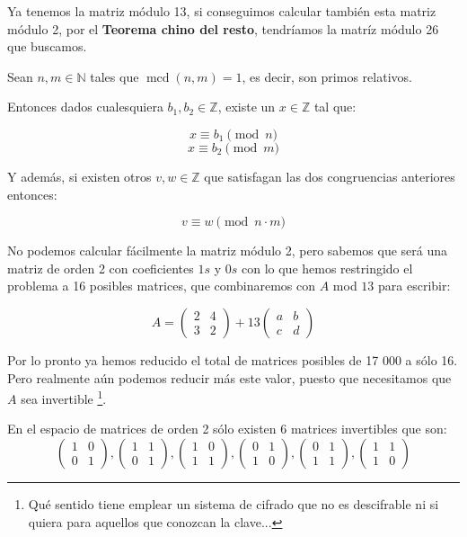 \begin{example}
Ya tenemos la matriz módulo 13, si conseguimos calcular también esta matriz módulo 2, por el \textbf{Teorema chino del resto}, tendríamos la matríz módulo 26 que buscamos.

\begin{theorem}
Sean $n,m \in \mathbb{N}$ tales que $ \operatorname{mcd}(n, m) = 1 $, es decir, son primos relativos.

Entonces dados cualesquiera $b_1,b_2 \in \mathbb{Z}$, existe un $x \in \mathbb{Z}$ tal que:

\[x \equiv b_1 \pmod n\]
\[x \equiv b_2 \pmod m\]

Y además, si existen otros $v,w \in \mathbb{Z}$ que satisfagan las dos congruencias anteriores entonces:

\[v \equiv w \pmod {n \cdot m} \]
\label{thm:CRTh}
\end{theorem}

No podemos calcular fácilmente la matriz módulo 2, pero sabemos que será una matriz de orden 2 con coeficientes $1s$ y $0s$ con lo que hemos restringido el problema a 16 posibles matrices, que combinaremos con $A$ mod $13$ para escribir:

\[A = \left( \begin{array}{cc}
2 & 4 \\
3 & 2  \end{array} \right) + 13 \left( \begin{array}{cc}
a & b \\
c & d  \end{array} \right)\]

Por lo pronto ya hemos reducido el total de matrices posibles de 17 000 a sólo 16. Pero realmente aún podemos reducir más este valor, puesto que necesitamos que $A$ sea invertible \footnote{Qué sentido tiene emplear un sistema de cifrado que no es descifrable ni si quiera para aquellos que conozcan la clave...}.

En el espacio de matrices de orden 2 sólo existen 6 matrices invertibles que son:
\[\left( \begin{array}{cc}
1 & 0 \\
0 & 1  \end{array} \right),\left( \begin{array}{cc}
1 & 1 \\
0 & 1  \end{array} \right),\left( \begin{array}{cc}
1 & 0 \\
1 & 1  \end{array} \right),\left( \begin{array}{cc}
0 & 1 \\
1 & 0  \end{array} \right),\left( \begin{array}{cc}
0 & 1 \\
1 & 1  \end{array} \right),\left( \begin{array}{cc}
1 & 1 \\
1 & 0  \end{array} \right)\]


\end{example}
